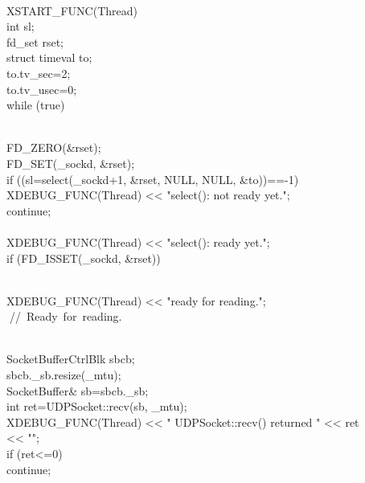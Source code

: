 \documentclass{article}
\begin{document}
 {
\\
         XSTART_FUNC(Thread)
\\
         int sl;
\\
         fd_set rset;
\\
         struct timeval to;
\\
         to.tv_sec=2;
\\
         to.tv_usec=0;
\\
         while (true) {
\\
                 FD_ZERO(&rset);
\\
                 FD_SET(_sockd, &rset);
\\
                 if ((sl=select(_sockd+1, &rset, NULL, NULL, &to))==-1) {
\\
                         XDEBUG_FUNC(Thread) << "select(): not ready yet.\n";
\\
                         continue;
\\
                 }
\\
                 XDEBUG_FUNC(Thread) << "select(): ready yet.\n";
\\
                 if (FD_ISSET(_sockd, &rset)) {
\\
                         XDEBUG_FUNC(Thread) << "ready for reading.\n";
\\
                         
\hbox{// Ready for reading.}\strut\\
                         SocketBufferCtrlBlk sbcb;
\\
                         sbcb._sb.resize(_mtu);
\\
                         SocketBuffer& sb=sbcb._sb;
\\
                 int ret=UDPSocket::recv(sb, _mtu);
\\
                         XDEBUG_FUNC(Thread) << " UDPSocket::recv() returned " << ret 
\\
                                                                 << "\n";
\\
                         if (ret<=0)
\\
                                 continue;
}}}
\end{document}
